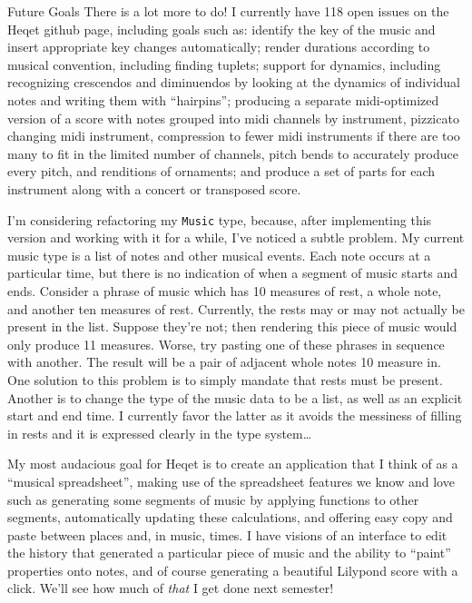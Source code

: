 \documentclass{article}
\begin{document}
\begin{section}{Future Goals}
There is a lot more to do! I currently have 118 open issues on the Heqet github page, including goals such as: identify the key of the music and insert appropriate key changes automatically; render durations according to musical convention, including finding tuplets; support for dynamics, including recognizing crescendos and diminuendos by looking at the dynamics of individual notes and writing them with ``hairpins''; producing a separate midi-optimized version of a score with notes grouped into midi channels by instrument, pizzicato changing midi instrument, compression to fewer midi instruments if there are too many to fit in the limited number of channels, pitch bends to accurately produce every pitch, and renditions of ornaments; and produce a  set of parts for each instrument along with a concert or transposed score. 

I'm considering refactoring my \verb+Music+ type, because, after implementing this version and working with it for a while, I've noticed a subtle problem. My current music type is a list of notes and other musical events. Each note occurs at a particular time, but there is no indication of when a segment of music starts and ends. Consider a phrase of music which has 10 measures of rest, a whole note, and another ten measures of rest. Currently, the rests may or may not actually be present in the list. Suppose they're not; then rendering this piece of music would only produce 11 measures. Worse, try pasting one of these phrases in sequence with another. The result will be a pair of adjacent whole notes 10 measure in. One solution to this problem is to simply mandate that rests must be present. Another is to change the type of the music data to be a list, as well as an explicit start and end time. I currently favor the latter as it avoids the messiness of filling in rests and it is expressed clearly in the type system\dots

My most audacious goal for Heqet is to create an application that I think of as a ``musical spreadsheet'', 
making use of the spreadsheet features we know and love such as generating some segments of music by applying functions to other segments, automatically updating these calculations, and offering easy copy and paste between places and, in music, times. I have visions of an interface to edit the history that generated a particular piece of music and the ability to ``paint'' properties onto notes, and of course generating a beautiful Lilypond score with a click. We'll see how much of \emph{that} I get done next semester!
\end{section}
\end{document}
